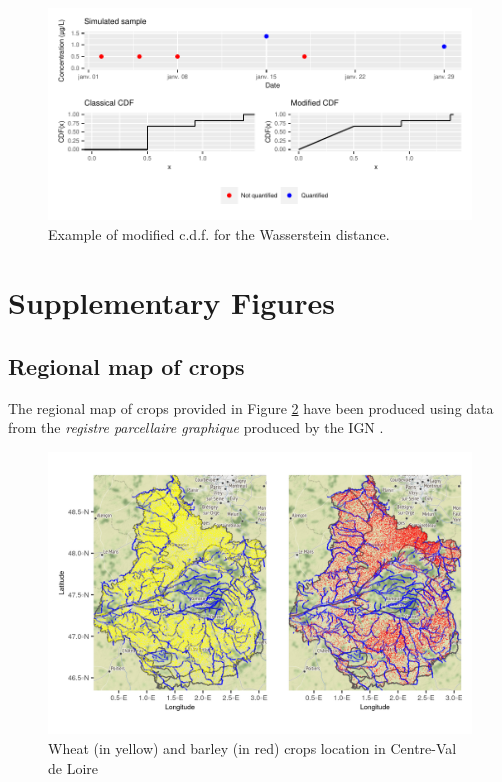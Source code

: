 \begin{appendices}
\begin{figure}[H]
    \centering
    \includegraphics{figs/App/Wass_ew.pdf}
    \caption{Example of modified c.d.f. for the Wasserstein distance.}
    \label{fig:mod_dist}
\end{figure}

\section{Supplementary Figures}

\subsection{Regional map of crops}\label{section:crops}
The regional map of crops provided in Figure \ref{fig:crops} have been produced using data from the \emph{registre parcellaire graphique} produced by the IGN \cite{IGN:RPG}.

\begin{figure}[H]
    \centering
    \includegraphics{figs/App/Occ_soil.png}
    \caption{Wheat (in yellow) and barley (in red) crops location in Centre-Val de Loire}
    \label{fig:crops}
\end{figure} 


\end{appendices}
